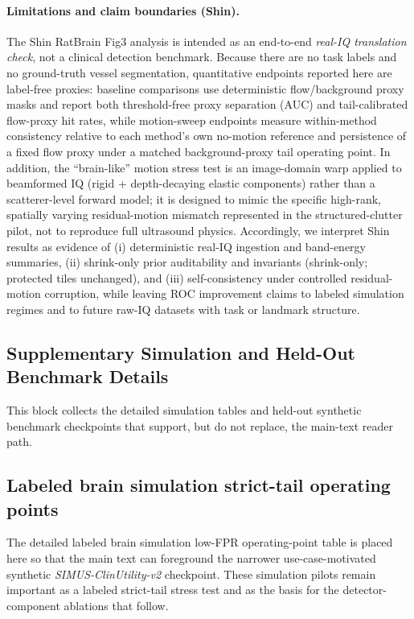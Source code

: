 \paragraph{Limitations and claim boundaries (Shin).}
The Shin RatBrain Fig3 analysis is intended as an end-to-end \emph{real-IQ translation check}, not a clinical detection benchmark.
Because there are no task labels and no ground-truth vessel segmentation, quantitative endpoints reported here are label-free proxies: baseline comparisons use deterministic flow/background proxy masks and report both threshold-free proxy separation (AUC) and tail-calibrated flow-proxy hit rates, while motion-sweep endpoints measure within-method consistency relative to each method's own no-motion reference and persistence of a fixed flow proxy under a matched background-proxy tail operating point.
In addition, the ``brain-like'' motion stress test is an image-domain warp applied to beamformed IQ (rigid + depth-decaying elastic components) rather than a scatterer-level forward model; it is designed to mimic the specific high-rank, spatially varying residual-motion mismatch represented in the structured-clutter pilot, not to reproduce full ultrasound physics.
Accordingly, we interpret Shin results as evidence of (i) deterministic real-IQ ingestion and band-energy summaries, (ii) shrink-only prior auditability and invariants (shrink-only; protected tiles unchanged), and (iii) self-consistency under controlled residual-motion corruption, while leaving ROC improvement claims to labeled simulation regimes and to future raw-IQ datasets with task or landmark structure.

\subsection*{Supplementary Simulation and Held-Out Benchmark Details}
This block collects the detailed simulation tables and held-out synthetic benchmark checkpoints that support, but do not replace, the main-text reader path.

\subsection{Labeled brain simulation strict-tail operating points}
\label{app:brain-kwave-vnext-table}
The detailed labeled brain simulation low-FPR operating-point table is placed here so that the main text can foreground the narrower use-case-motivated synthetic \emph{SIMUS-ClinUtility-v2} checkpoint. These simulation pilots remain important as a labeled strict-tail stress test and as the basis for the detector-component ablations that follow.

